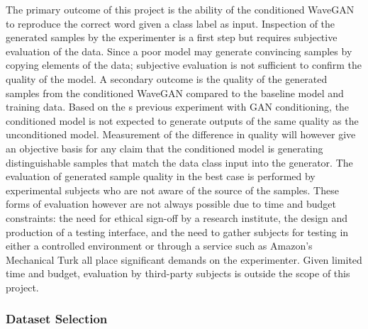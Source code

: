 \documentclass[a4paper, dvipsnames, titlepage]{article}
\begin{document}
The primary outcome of this project is the ability of the conditioned WaveGAN to reproduce the correct word given a class label as input.
Inspection of the generated samples by the experimenter is a first step but requires subjective evaluation of the data.
Since a poor model may generate convincing samples by copying elements of the data; subjective evaluation is not sufficient to confirm the quality of the model.
\newline
\newline
A secondary outcome is the quality of the generated samples from the conditioned WaveGAN compared to the baseline model and training data.
Based on the \citeauthor{2014arXiv1411.1784M}s previous experiment with GAN conditioning, the conditioned model is not expected to generate outputs of the same quality as the unconditioned model.
Measurement of the difference in quality will however give an objective basis for any claim that the conditioned model is generating distinguishable samples that match the data class input into the generator.
\newline
\newline
The evaluation of generated sample quality in the best case is performed by experimental subjects who are not aware of the source of the samples.
These forms of evaluation however are not always possible due to time and budget constraints: the need for ethical sign-off by a research institute, the design and production of a testing interface, and the need to gather subjects for testing in either a controlled environment or through a service such as Amazon's Mechanical Turk all place significant demands on the experimenter.
Given limited time and budget, evaluation by third-party subjects is outside the scope of this project.

\subsubsection{Dataset Selection}
\end{document}
